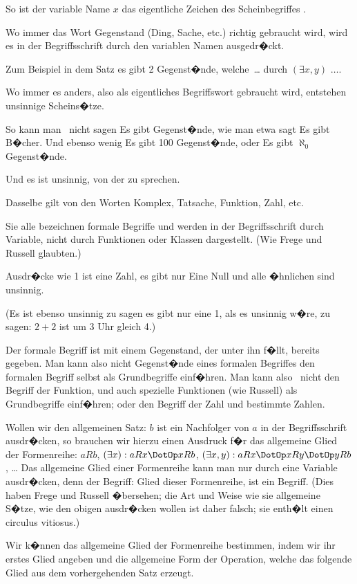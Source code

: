 {So ist der variable Name \glqq{}$x$\grqq{} das eigentliche
Zeichen des Scheinbegriffes .

Wo immer das Wort \glqq{}Gegenstand\grqq{} (\glqq{}Ding\grqq{},
\glqq{}Sache\grqq{}, etc.) richtig gebraucht wird, wird es in
der Begriffsschrift durch den variablen Namen
ausgedr�ckt.

Zum Beispiel in dem Satz \glqq{}es gibt 2 Gegenst�nde,
welche\ \ldots\grqq{} durch \glqq{}$(\exists x, y)$ $\ldots$\grqq{}.

Wo immer es anders, also als eigentliches
Begriffswort gebraucht wird, entstehen unsinnige
Scheins�tze.

So kann man \zumBeispiel\ nicht sagen \glqq{}Es gibt Gegenst�nde\grqq{},
wie man etwa sagt \glqq{}Es gibt B�cher\grqq{}.
Und ebenso wenig \glqq{}Es gibt 100 Gegenst�nde\grqq{},
oder \glqq{}Es gibt $\aleph_0$ Gegenst�nde\grqq{}.

Und es ist unsinnig, von der  zu sprechen.

Dasselbe gilt von den Worten \glqq{}Komplex\grqq{},
\glqq{}Tatsache\grqq{}, \glqq{}Funktion\grqq{}, \glqq{}Zahl\grqq{}, etc.

Sie alle bezeichnen formale Begriffe und werden
in der Begriffsschrift durch Variable, nicht durch
Funktionen oder Klassen dargestellt. (Wie Frege
und Russell glaubten.)

Ausdr�cke wie \glqq{}1 ist eine Zahl\grqq{}, \glqq{}es gibt nur
Eine Null\grqq{} und alle �hnlichen sind unsinnig.

(Es ist ebenso unsinnig zu sagen \glqq{}es gibt nur
eine 1\grqq{}, als es unsinnig w�re, zu sagen: $2 + 2$ ist
um 3 Uhr gleich 4.)}


{Der formale Begriff ist mit einem Gegenstand,
der unter ihn f�llt, bereits gegeben. Man kann
also nicht Gegenst�nde eines formalen Begriffes
 den formalen Begriff selbst als Grundbegriffe
einf�hren. Man kann also \zumBeispiel\ nicht den Begriff
der Funktion, und auch spezielle Funktionen (wie
Russell) als Grundbegriffe einf�hren; oder den
Begriff der Zahl und bestimmte Zahlen.}


{Wollen wir den allgemeinen Satz: \glqq{}$b$ ist ein
Nachfolger von $a$\grqq{} in der Begriffsschrift ausdr�cken,
so brauchen wir hierzu einen Ausdruck
f�r das allgemeine Glied der Formenreihe: $aRb$,
$(\exists x) : aRx \DotOp xRb$, $(\exists x,y) : aRx \DotOp xRy \DotOp yRb$, \ldots{} Das
allgemeine Glied einer Formenreihe kann man nur
durch eine Variable ausdr�cken, denn der Begriff:
Glied dieser Formenreihe, ist ein 
Begriff. (Dies haben Frege und Russell �bersehen;
die Art und Weise wie sie allgemeine
S�tze, wie den obigen ausdr�cken wollen ist daher
falsch; sie enth�lt einen circulus vitiosus.)

Wir k�nnen das allgemeine Glied der Formenreihe
bestimmen, indem wir ihr erstes Glied
angeben und die allgemeine Form der Operation,
welche das folgende Glied aus dem vorhergehenden
Satz erzeugt.}


